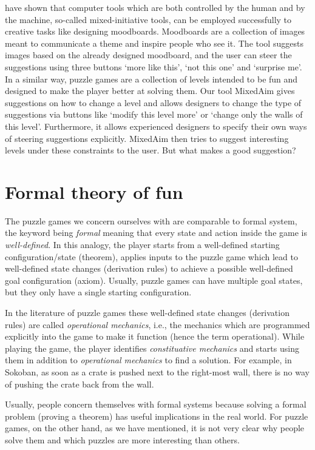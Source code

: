 \cite{Koch} have shown that computer tools which are both controlled by the human and by the machine, so-called mixed-initiative tools, can be employed successfully to creative tasks like designing moodboards. Moodboards are a collection of images meant to communicate a theme and inspire people who see it. The tool suggests images based on the already designed moodboard, and the user can steer the suggestions using three buttons `more like this', `not this one' and `surprise me'. In a similar way, puzzle games are a collection of levels intended to be fun and designed to make the player better at solving them. Our tool MixedAim gives suggestions on how to change a level and allows designers to change the type of suggestions via buttons like `modify this level more' or `change only the walls of this level'. Furthermore, it allows experienced designers to specify their own ways of steering suggestions explicitly.
MixedAim then tries to suggest interesting levels under these constraints to the user. But what makes a good suggestion? 


\section{Formal theory of fun}
The puzzle games we concern ourselves with are comparable to formal system, the keyword being \textit{formal} meaning that every state and action inside the game is \textit{well-defined}.
In this analogy, the player starts from a well-defined starting configuration/state (theorem), applies inputs to the puzzle game which lead to well-defined state changes (derivation rules) to achieve a possible well-defined goal configuration (axiom). Usually, puzzle games can have multiple goal states, but they only have a single starting configuration.

In the literature of puzzle games \cite{RulesOfPlay} these well-defined state changes (derivation rules) are called  \textit{operational mechanics}, i.e., the mechanics which are programmed explicitly into the game to make it function (hence the term operational). While playing the game, the player identifies \textit{constituative mechanics} and starts using them in addition to \textit{operational mechanics} to find a solution. For example, in Sokoban, as soon as a crate is pushed next to the right-most wall, there is no way of pushing the crate back from the wall. 

Usually, people concern themselves with formal systems because solving a formal problem (proving a theorem) has useful implications in the real world. For puzzle games, on the other hand, as we have mentioned, it is not very clear why people solve them and which puzzles are more interesting than others.

